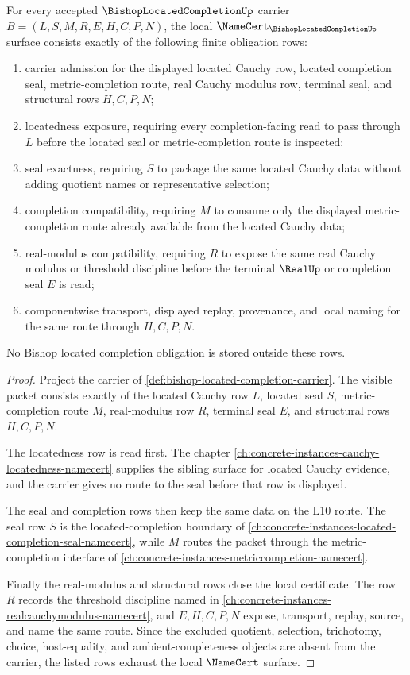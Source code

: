 \begin{theorem}
\label{thm:bishop-located-completion-namecert}
For every accepted $\BishopLocatedCompletionUp$ carrier $B=(L,S,M,R,E,H,C,P,N)$, the local $\NameCert_{\BishopLocatedCompletionUp}$ surface consists exactly of the following finite obligation rows:
\begin{enumerate}
\item carrier admission for the displayed located Cauchy row, located completion seal, metric-completion route, real Cauchy modulus row, terminal seal, and structural rows $H,C,P,N$;
\item locatedness exposure, requiring every completion-facing read to pass through $L$ before the located seal or metric-completion route is inspected;
\item seal exactness, requiring $S$ to package the same located Cauchy data without adding quotient names or representative selection;
\item completion compatibility, requiring $M$ to consume only the displayed metric-completion route already available from the located Cauchy data;
\item real-modulus compatibility, requiring $R$ to expose the same real Cauchy modulus or threshold discipline before the terminal $\RealUp$ or completion seal $E$ is read;
\item componentwise transport, displayed replay, provenance, and local naming for the same route through $H,C,P,N$.
\end{enumerate}
No Bishop located completion obligation is stored outside these rows.
\end{theorem}
\begin{proof}
Project the carrier of \autoref{def:bishop-located-completion-carrier}. The visible packet consists exactly of the located Cauchy row $L$, located seal $S$, metric-completion route $M$, real-modulus row $R$, terminal seal $E$, and structural rows $H,C,P,N$.

The locatedness row is read first. The chapter \autoref{ch:concrete-instances-cauchy-locatedness-namecert} supplies the sibling surface for located Cauchy evidence, and the carrier gives no route to the seal before that row is displayed.

The seal and completion rows then keep the same data on the L10 route. The seal row $S$ is the located-completion boundary of \autoref{ch:concrete-instances-located-completion-seal-namecert}, while $M$ routes the packet through the metric-completion interface of \autoref{ch:concrete-instances-metriccompletion-namecert}.

Finally the real-modulus and structural rows close the local certificate. The row $R$ records the threshold discipline named in \autoref{ch:concrete-instances-realcauchymodulus-namecert}, and $E,H,C,P,N$ expose, transport, replay, source, and name the same route. Since the excluded quotient, selection, trichotomy, choice, host-equality, and ambient-completeness objects are absent from the carrier, the listed rows exhaust the local $\NameCert$ surface.
\end{proof}

